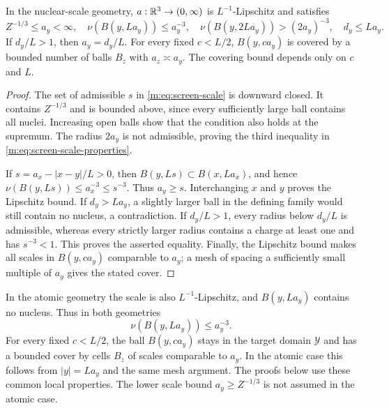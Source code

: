 \begin{lemma}\label{m:lem:screen-scale}
In the nuclear-scale geometry, $a:\mathbb R^3\to(0,\infty)$ is
$L^{-1}$-Lipschitz and satisfies
\begin{equation}\label{m:eq:screen-scale-properties}
 Z^{-1/3}\le a_y<\infty,\quad
 \nu(B(y,La_y))\le a_y^{-3},\quad
 \nu(B(y,2La_y))>(2a_y)^{-3},\quad d_y\le La_y.
\end{equation}
If $d_y/L>1$, then $a_y=d_y/L$.  For every fixed $c<L/2$,
$B(y,ca_y)$ is covered by a bounded number of balls $B_z$ with
$a_z\asymp a_y$.  The covering bound depends only on $c$ and $L$.
\end{lemma}

\begin{proof}
The set of admissible $s$ in \eqref{m:eq:screen-scale} is downward closed.
It contains $Z^{-1/3}$ and is bounded above, since every sufficiently large
ball contains all nuclei.  Increasing open balls show that the condition
also holds at the supremum.  The radius $2a_y$ is not admissible, proving
the third inequality in \eqref{m:eq:screen-scale-properties}.

If $s=a_x-|x-y|/L>0$, then
$B(y,Ls)\subset B(x,La_x)$, and hence
$\nu(B(y,Ls))\le a_x^{-3}\le s^{-3}$.  Thus $a_y\ge s$.
Interchanging $x$ and $y$ proves the Lipschitz bound.  If $d_y>La_y$,
a slightly larger ball in the defining family would still contain no
nucleus, a contradiction.  If $d_y/L>1$, every radius below $d_y/L$ is
admissible, whereas every strictly larger radius contains a charge at
least one and has $s^{-3}<1$.  This proves the asserted equality.
Finally, the Lipschitz bound makes all scales in $B(y,ca_y)$ comparable
to $a_y$; a mesh of spacing a sufficiently small multiple of $a_y$
gives the stated cover.
\end{proof}

In the atomic geometry the scale is also $L^{-1}$-Lipschitz, and
$B(y,La_y)$ contains no nucleus.  Thus in both geometries
\[
 \nu(B(y,La_y))\le a_y^{-3}.
\]
For every fixed $c<L/2$, the ball $B(y,ca_y)$ stays in the target
domain $\mathcal Y$ and has a bounded cover by cells $B_z$ of scales
comparable to $a_y$.  In the atomic case this follows from
$|y|=La_y$ and the same mesh argument.  The proofs below use these
common local properties.  The lower scale bound $a_y\ge Z^{-1/3}$
is not assumed in the atomic case.

